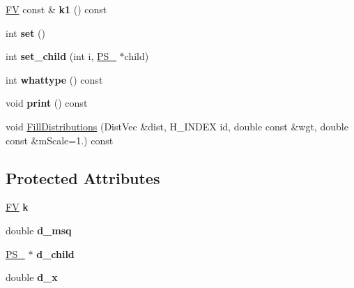 \begin{DoxyCompactItemize}
\item 
\hypertarget{classPS__2__1_a8896fae62d323bceb002628a95466f3f}{}\hyperlink{classFV}{F\+V} const \& {\bfseries k1} () const \label{classPS__2__1_a8896fae62d323bceb002628a95466f3f}

\item 
\hypertarget{classPS__2__1_a02e613ae4acac6c2ea9c57a49a8e3f68}{}int {\bfseries set} ()\label{classPS__2__1_a02e613ae4acac6c2ea9c57a49a8e3f68}

\item 
\hypertarget{classPS__2__1_a3bcae5991298ad9a2fc143d4461c60fa}{}int {\bfseries set\+\_\+child} (int i, \hyperlink{classPS__2}{P\+S\+\_} $\ast$child)\label{classPS__2__1_a3bcae5991298ad9a2fc143d4461c60fa}

\item 
\hypertarget{classPS__2__1_aaa0d8ed0b5e2673cb5f2cd84f090e1f9}{}int {\bfseries whattype} () const \label{classPS__2__1_aaa0d8ed0b5e2673cb5f2cd84f090e1f9}

\item 
\hypertarget{classPS__2__1_a21760964ae4b35c2cfeff16b4c569c3a}{}void {\bfseries print} () const \label{classPS__2__1_a21760964ae4b35c2cfeff16b4c569c3a}

\item 
void \hyperlink{classPS__2__1_a5cf9231c96cfcb45b3b5dbf6646f68f3}{Fill\+Distributions} (Dist\+Vec \&dist, H\+\_\+\+I\+N\+D\+E\+X id, double const \&wgt, double const \&m\+Scale=1.) const 
\end{DoxyCompactItemize}
\subsection*{Protected Attributes}
\begin{DoxyCompactItemize}
\item 
\hypertarget{classPS__2__1_a3606766aee8e4775462c15adda3acbc5}{}\hyperlink{classFV}{F\+V} {\bfseries k}\label{classPS__2__1_a3606766aee8e4775462c15adda3acbc5}

\item 
\hypertarget{classPS__2__1_a415b225aedab250a67aee39ef0d859bc}{}double {\bfseries d\+\_\+msq}\label{classPS__2__1_a415b225aedab250a67aee39ef0d859bc}

\item 
\hypertarget{classPS__2__1_a015027e1fc8e30949ea8a439cfedddd4}{}\hyperlink{classPS__2}{P\+S\+\_} $\ast$ {\bfseries d\+\_\+child}\label{classPS__2__1_a015027e1fc8e30949ea8a439cfedddd4}

\item 
\hypertarget{classPS__2__1_af18aa8f6679b7ac65be236b00e794e0c}{}double {\bfseries d\+\_\+x}\label{classPS__2__1_af18aa8f6679b7ac65be236b00e794e0c}

\end{DoxyCompactItemize}
